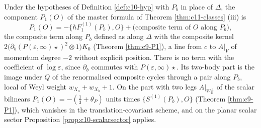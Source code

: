 \begin{proposition}
\label{prop:c10-P1}
Under the hypotheses of Definition \ref{def:c10-hyp} with $P_b$ in place of $\Delta$, the component $P_1(O)$ of the master formula of Theorem \ref{thm:c11-classes} (iii) is
\[
P_1(O)=-\big\{\hbar F_1^{(1)}(P_b),O\big\}+\big(\text{composite term of }O\text{ along }P_b\big),
\]
the composite term along $P_b$ defined as along $\Delta$ with the composite kernel $2\big(\partial_b(P(\varepsilon,\infty)\star)^2\otimes1\big)K_0$ (Theorem \ref{thm:c9-P1}), a line from $c$ to $A|_V$ of momentum degree $-2$ without explicit position. There is no term with the coefficient of $\log\varepsilon$, since $\partial_b$ commutes with $P(\varepsilon,\infty)\star$. Its two-body part is the image under $Q$ of the renormalised composite cycles through a pair along $P_b$, local of Weyl weight $w_{X_a}+w_{X_b}+1$. On the part with two legs $A|_{W_{\mathbb R}^\perp}$ of the scalar bilinears $P_1(O)=-(\tfrac13+\theta_P)$ units times $\{S^{(1)}(P_b),O\}$ (Theorem \ref{thm:c9-P1}), which vanishes in the translation-covariant scheme, and on the planar scalar sector Proposition \ref{prop:c10-scalarsector} applies.
\end{proposition}
